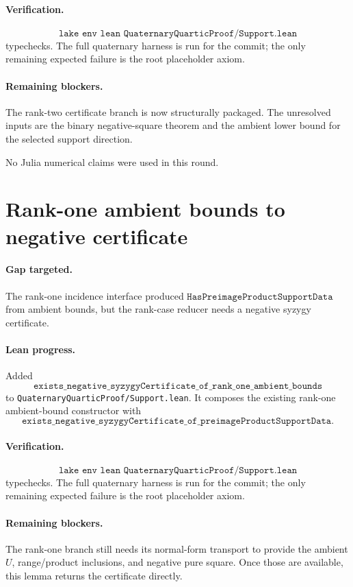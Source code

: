 \documentclass[11pt]{article}
\begin{document}
\paragraph{Verification.}
\[
\texttt{lake env lean QuaternaryQuarticProof/Support.lean}
\]
typechecks.  The full quaternary harness is run for the commit; the only
remaining expected failure is the root placeholder axiom.

\paragraph{Remaining blockers.}
The rank-two certificate branch is now structurally packaged.  The unresolved
inputs are the binary negative-square theorem and the ambient lower bound for
the selected support direction.

No Julia numerical claims were used in this round.

\section*{Rank-one ambient bounds to negative certificate}

\paragraph{Gap targeted.}
The rank-one incidence interface produced
\(\texttt{HasPreimageProductSupportData}\) from ambient bounds, but the
rank-case reducer needs a negative syzygy certificate.

\paragraph{Lean progress.}
Added
\[
\texttt{exists\_negative\_syzygyCertificate\_of\_rank\_one\_ambient\_bounds}
\]
to \texttt{QuaternaryQuarticProof/Support.lean}.  It composes the existing
rank-one ambient-bound constructor with
\[
\texttt{exists\_negative\_syzygyCertificate\_of\_preimageProductSupportData}.
\]

\paragraph{Verification.}
\[
\texttt{lake env lean QuaternaryQuarticProof/Support.lean}
\]
typechecks.  The full quaternary harness is run for the commit; the only
remaining expected failure is the root placeholder axiom.

\paragraph{Remaining blockers.}
The rank-one branch still needs its normal-form transport to provide the
ambient \(U\), range/product inclusions, and negative pure square.  Once those
are available, this lemma returns the certificate directly.
\end{document}
